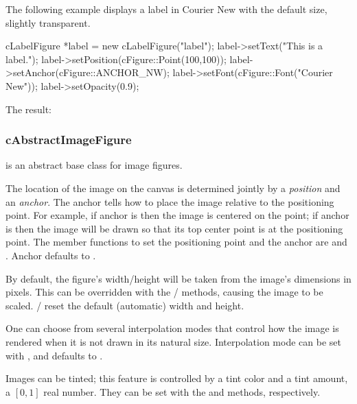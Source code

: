 The following example displays a label in Courier New with the default
size, slightly transparent.

\begin{cpp}
cLabelFigure *label = new cLabelFigure("label");
label->setText("This is a label.");
label->setPosition(cFigure::Point(100,100));
label->setAnchor(cFigure::ANCHOR_NW);
label->setFont(cFigure::Font("Courier New"));
label->setOpacity(0.9);
\end{cpp}


The result:

\begin{center}

\end{center}


\subsubsection{cAbstractImageFigure}
\label{sec:graphics:abstractimagefigure}

 is an abstract base class for image figures.

The location of the image on the canvas is determined jointly by a
\textit{position} and an \textit{anchor}. The anchor tells how to
place the image relative to the positioning point. For example,
if anchor is  then the image is centered on the point;
if anchor is  then the image will be drawn so that its top
center point is at the positioning point. The member functions to set the
positioning point and the anchor are  and
. Anchor defaults to .

By default, the figure's width/height will be taken from the image's
dimensions in pixels. This can be overridden with the /
 methods, causing the image to be scaled.
 /  reset the default (automatic) width
and height.

One can choose from several interpolation modes that control how the image
is rendered when it is not drawn in its natural size. Interpolation mode
can be set with , and defaults to
.

Images can be tinted; this feature is controlled by a tint color and a tint
amount, a $[0,1]$ real number. They can be set with the
 and  methods, respectively.

